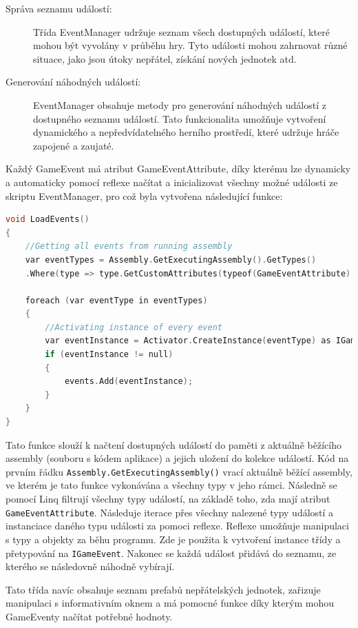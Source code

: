 \begin{description}
	\item[Správa seznamu událostí:] Třída EventManager udržuje seznam všech dostupných událostí, které mohou být vyvolány v průběhu hry. Tyto události mohou zahrnovat různé situace, jako jsou útoky nepřátel, získání nových jednotek atd.
	\item[Generování náhodných událostí:] EventManager obsahuje metody pro generování náhodných událostí z dostupného seznamu událostí. Tato funkcionalita umožňuje vytvoření dynamického a nepředvídatelného herního prostředí, které udržuje hráče zapojené a zaujaté.
\end{description}

Každý GameEvent má atribut GameEventAttribute, díky kterému lze dynamicky a automaticky pomocí reflexe načítat a inicializovat všechny možné události ze skriptu EventManager, pro což byla vytvořena následující funkce:

\newpage

\begin{lstlisting}[language=C]
void LoadEvents()
{
	//Getting all events from running assembly
	var eventTypes = Assembly.GetExecutingAssembly().GetTypes()
	.Where(type => type.GetCustomAttributes(typeof(GameEventAttribute), true).Length > 0);

	foreach (var eventType in eventTypes)
	{
		//Activating instance of every event
		var eventInstance = Activator.CreateInstance(eventType) as IGameEvent;
		if (eventInstance != null)
		{
			events.Add(eventInstance);
		}
	}
}
\end{lstlisting}

Tato funkce slouží k načtení dostupných událostí do paměti z aktuálně běžícího assembly (souboru s kódem aplikace) a jejich uložení do kolekce událostí. Kód na prvním řádku \texttt{Assembly.GetExecutingAssembly()} vrací aktuálně běžící assembly, ve kterém je tato funkce vykonávána a všechny typy v jeho rámci. Následně se pomocí Linq filtrují všechny typy událostí, na základě toho, zda mají atribut \texttt{GameEventAttribute}. Následuje iterace přes všechny nalezené typy událostí a instanciace daného typu události za pomoci reflexe. Reflexe umožňuje manipulaci s typy a objekty za běhu programu. Zde je použita k vytvoření instance třídy a přetypování na \texttt{IGameEvent}. Nakonec se každá událost přidává do seznamu, ze kterého se následovně náhodně vybírají.

Tato třída navíc obsahuje seznam prefabů nepřátelských jednotek, zařizuje manipulaci s informativním oknem a má pomocné funkce díky kterým mohou GameEventy načítat potřebné hodnoty.

